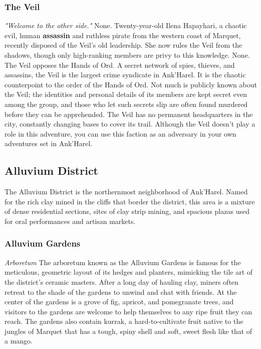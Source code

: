 \documentclass[10pt,a4,twoside,twocolumn,openany,nodeprecatedcode]{dndbook}
\begin{document}
\subsubsection{The Veil}
\textit{"Welcome to the other side."}
{{None.}}
{{Twenty-year-old Ilena Hapayhari, a chaotic evil, human \textbf{assassin} and ruthless pirate from the western coast of Marquet, recently disposed of the Veil's old leadership. She now rules the Veil from the shadows, though only high-ranking members are privy to this knowledge.}}
{{None.}}
{{The Veil opposes the Hands of Ord.}}
A secret network of spies, thieves, and assassins, the Veil is the largest crime syndicate in Ank'Harel. It is the chaotic counterpoint to the order of the Hands of Ord.
Not much is publicly known about the Veil; the identities and personal details of its members are kept secret even among the group, and those who let such secrets slip are often found murdered before they can be apprehended. The Veil has no permanent headquarters in the city, constantly changing bases to cover its trail.
Although the Veil doesn't play a role in this adventure, you can use this faction as an adversary in your own adventures set in Ank'Harel.
\subsection{Alluvium District}
The Alluvium District is the northernmost neighborhood of Ank'Harel. Named for the rich clay mined in the cliffs that border the district, this area is a mixture of dense residential sections, sites of clay strip mining, and spacious plazas used for oral performances and artisan markets.
\subsubsection{Alluvium Gardens}
\textit{Arboretum}
The arboretum known as the Alluvium Gardens is famous for the meticulous, geometric layout of its hedges and planters, mimicking the tile art of the district's ceramic masters. After a long day of hauling clay, miners often retreat to the shade of the gardens to unwind and chat with friends. At the center of the gardens is a grove of fig, apricot, and pomegranate trees, and visitors to the gardens are welcome to help themselves to any ripe fruit they can reach. The gardens also contain kurrak, a hard-to-cultivate fruit native to the jungles of Marquet that has a tough, spiny shell and soft, sweet flesh like that of a mango.
\end{document}
